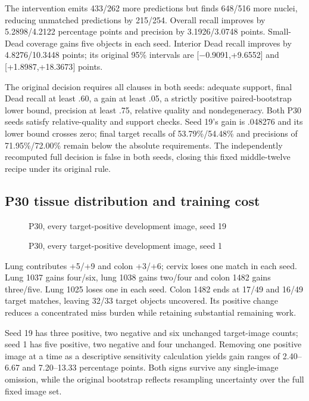 \documentclass[
  11pt,
]{article}
\begin{document}
The intervention emits 433/262 more predictions but finds 648/516 more
nuclei, reducing unmatched predictions by 215/254. Overall recall
improves by 5.2898/4.2122 percentage points and precision by
3.1926/3.0748 points. Small-Dead coverage gains five objects in each
seed. Interior Dead recall improves by 4.8276/10.3448 points; its
original 95\% intervals are {[}−0.9091,+9.6552{]} and
{[}+1.8987,+18.3673{]} points.

The original decision requires all clauses in both seeds: adequate
support, final Dead recall at least .60, a gain at least .05, a strictly
positive paired-bootstrap lower bound, precision at least .75, relative
quality and nondegeneracy. Both P30 seeds satisfy relative-quality and
support checks. Seed 19's gain is .048276 and its lower bound crosses
zero; final target recalls of 53.79\%/54.48\% and precisions of
71.95\%/72.00\% remain below the absolute requirements. The
independently recomputed full decision is false in both seeds, closing
this fixed middle-twelve recipe under its original rule.

\subsection{P30 tissue distribution and training
cost}\label{p30-tissue-distribution-and-training-cost}

\begin{figure}[H]\centering

\caption{P30, every target-positive development image, seed 19}
\end{figure}

\begin{figure}[H]\centering

\caption{P30, every target-positive development image, seed 1}
\end{figure}

Lung contributes +5/+9 and colon +3/+6; cervix loses one match in each
seed. Lung 1037 gains four/six, lung 1038 gains two/four and colon 1482
gains three/five. Lung 1025 loses one in each seed. Colon 1482 ends at
17/49 and 16/49 target matches, leaving 32/33 target objects uncovered.
Its positive change reduces a concentrated miss burden while retaining
substantial remaining work.

Seed 19 has three positive, two negative and six unchanged target-image
counts; seed 1 has five positive, two negative and four unchanged.
Removing one positive image at a time as a descriptive sensitivity
calculation yields gain ranges of 2.40--6.67 and 7.20--13.33 percentage
points. Both signs survive any single-image omission, while the original
bootstrap reflects resampling uncertainty over the full fixed image set.
\end{document}

